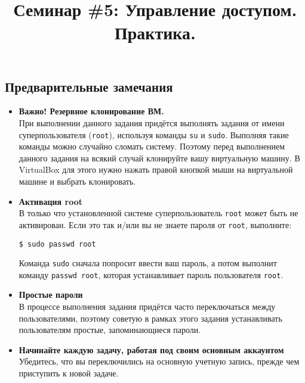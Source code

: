 \documentclass{article}
\begin{document}
\title{Семинар \#5: Управление доступом. Практика. \vspace{-5ex}}\date{}\maketitle
\subsection*{Предварительные замечания}
\begin{itemize}
\item \textbf{Важно! Резервное клонирование ВМ.} \\
При выполнении данного задания придётся выполнять задания от имени суперпользователя (\texttt{root}), используя команды \texttt{su} и \texttt{sudo}. Выполняя такие команды можно случайно сломать систему. Поэтому перед выполнением данного задания на всякий случай клонируйте вашу виртуальную машину. В VirtualBox для этого нужно нажать правой кнопкой мыши на виртуальной машине и выбрать клонировать.


\item \textbf{Активация root} \\
В только что установленной системе суперпользователь \texttt{root} может быть не активирован. Если это так и/или вы не знаете пароля от \texttt{root}, выполните:
\begin{lstlisting}
$ sudo passwd root
\end{lstlisting}
Команда \texttt{sudo} сначала попросит ввести ваш пароль, а потом выполнит команду \texttt{passwd root}, которая устанавливает пароль пользователя \texttt{root}.

\item \textbf{Простые пароли} \\
В процессе выполнения задания придётся часто переключаться между пользователями, поэтому советую в рамках этого задания устанавливать пользователям простые, запоминающиеся пароли.

\item \textbf{Начинайте каждую задачу, работая под своим основным аккаунтом} \\
Убедитесь, что вы переключились на основную учетную запись, прежде чем приступить к новой задаче.

\iffalse
\item \textbf{Создание нового пользователя} \\
Для проверки работы команд нам понадобится ещё один пользователь, помимо вашего основного пользователя и суперпользователя \texttt{root}. Создайте нового пользователя \texttt{alice}, используя следующие команды:
\begin{lstlisting}
sudo adduser -m alice
sudo passwd alice
\end{lstlisting}
\fi
\end{itemize}
\end{document}
